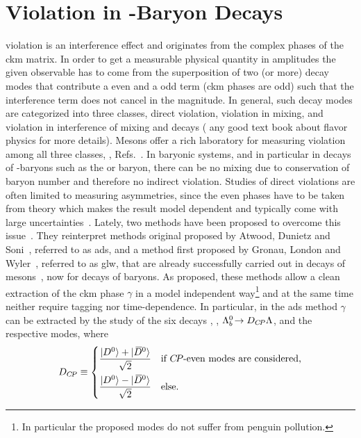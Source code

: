 \section{\texorpdfstring{\CP Violation in \bquark-Baryon Decays}{CP Violation in b-Baryon Decays}}
\label{sec:lbcpv}
\CP violation is an interference effect and originates from the complex phases of the \gls{ckm} matrix.
In order to get a measurable physical quantity in amplitudes the given observable has to come from the superposition of two (or more) decay modes that contribute a \CP even and a \CP odd term (\gls{ckm} phases are \CP odd) such that the interference term does not cancel in the magnitude.
In general, such decay modes are categorized into three classes, direct \CP violation, \CP violation in mixing, and \CP violation in interference of mixing and decays (\cf{} any good text book about flavor physics for more details).
Mesons offer a rich laboratory for measuring \CP violation among all three classes, \eg{}, Refs.~\cite{bsmixing,BsTohh_timecpv}.
In baryonic systems, and in particular in decays of \bquark-baryons such as the \Lb or \Xibz baryon, there can be no mixing due to conservation of baryon number and therefore no indirect \CP violation.
Studies of direct \CP violations are often limited to measuring asymmetries, since the \CP even phases have to be taken from theory which makes the result model dependent and typically come with large uncertainties~\cite{LbCPVAsym1,LbCPVAsym2}.
Lately, two methods have been proposed to overcome this issue~\cite{CPVbeautiful,brLbToDzLz_pred}.
They reinterpret methods original proposed by Atwood, Dunietz and Soni~\cite{ads1,ads2}, referred to as \gls{ads}, and a method first proposed by Gronau, London and Wyler~\cite{glw1,glw2}, referred to as \gls{glw}, that are already successfully carried out in decays of mesons~\cite{BdToDzKstar}, now for decays of baryons.
As proposed, these methods allow a clean extraction of the \gls{ckm} phase $\gamma$ in a model independent way\footnote{In particular the proposed modes do not suffer from penguin pollution.} and at the same time neither require tagging nor time-dependence.
In particular, in the \gls{ads} method $\gamma$ can be extracted by the study of the six decays \decay{\Lb}{\Dz\Lz}, \decay{\Lb}{\Dzb\Lz}, ${{\Lambda}^0_{b}}\!\rightarrow D_{{C\!P}}{\Lambda}$, and the respective \Lbbar modes, where
\begin{equation*}
    \PD_{\CP} \equiv
    \begin{dcases}
        \frac{\ket{\Dz} + \ket{\Dzb}}{\sqrt{2}} & \text{if \CP-even modes are considered,} \\
        \frac{\ket{\Dz} - \ket{\Dzb}}{\sqrt{2}} & \text{else.}
    \end{dcases}
\end{equation*}
